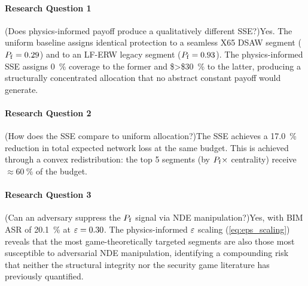 \paragraph{Research Question 1} (Does physics-informed payoff produce a
qualitatively different SSE?)\quad Yes.  The uniform baseline assigns
identical protection to a seamless X65 DSAW segment ($P_{\mathrm{f}} = 0.29$)
and to an LF-ERW legacy segment ($P_{\mathrm{f}} = 0.93$).  The
physics-informed SSE assigns \SI{0}{\percent} coverage to the former and
\SI{$>$30}{\percent} to the latter, producing a structurally concentrated
allocation that no abstract constant payoff would generate.

\paragraph{Research Question 2} (How does the SSE compare to uniform
allocation?)\quad The SSE achieves a \SI{17.0}{\percent} reduction in
total expected network loss at the same budget.  This is achieved through
a convex redistribution: the top 5 segments (by $P_{\mathrm{f}} \times$ centrality)
receive $\approx\SI{60}{\percent}$ of the budget.

\paragraph{Research Question 3} (Can an adversary suppress the $P_{\mathrm{f}}$
signal via NDE manipulation?)\quad Yes, with \ac{BIM} \acs{ASR} of
\SI{20.1}{\percent} at $\varepsilon = 0.30$.  The physics-informed
$\varepsilon$ scaling (\cref{eq:eps_scaling}) reveals that the most
game-theoretically targeted segments are also those most susceptible to
adversarial NDE manipulation, identifying a compounding risk that neither
the structural integrity nor the security game literature has previously
quantified.
